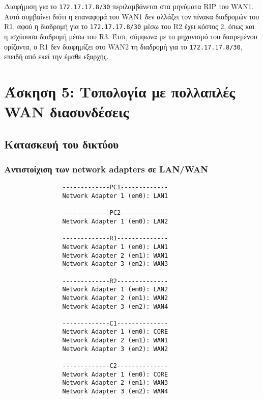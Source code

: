 \documentclass[a4paper, 12pt]{article}
\begin{document}
		Διαφήμιση για το \verb|172.17.17.8/30| περιλαμβάνεται στα μηνύματα RIP του WAN1. Αυτό συμβαίνει διότι η επαναφορά του WAN1 δεν αλλάζει τον πίνακα διαδρομών του R1, αφού η διαδρομή για το \verb|172.17.17.8/30| μέσω του R2 έχει κόστος 2, όπως και η ισχύουσα διαδρομή μέσω του R3. Έτσι, σύμφωνα με το μηχανισμό του διαιρεμένου ορίζοντα, ο R1 δεν διαφημίζει στο WAN2 τη διαδρομή για το \verb|172.17.17.8/30|, επειδή από εκεί την έμαθε εξαρχής.

\section*{Άσκηση 5: Τοπολογία με πολλαπλές WAN διασυνδέσεις}
	\subsection*{Κατασκευή του δικτύου}
		\subsubsection*{Αντιστοίχιση των network adapters σε LAN/WAN}
			\begin{verbatim}
				-------------PC1-------------
				Network Adapter 1 (em0): LAN1
				
				-------------PC2-------------
				Network Adapter 1 (em0): LAN2
					
				-------------R1--------------
				Network Adapter 1 (em0): LAN1
				Network Adapter 2 (em1): WAN1
				Network Adapter 3 (em2): WAN3
					
				-------------R2--------------
				Network Adapter 1 (em0): LAN2
				Network Adapter 2 (em1): WAN2
				Network Adapter 3 (em2): WAN4
				
				-------------C1--------------
				Network Adapter 1 (em0): CORE
				Network Adapter 2 (em1): WAN1
				Network Adapter 3 (em2): WAN2				
				
				-------------C2--------------
				Network Adapter 1 (em0): CORE
				Network Adapter 2 (em1): WAN3
				Network Adapter 3 (em2): WAN4
			\end{verbatim}
			
\end{document}
